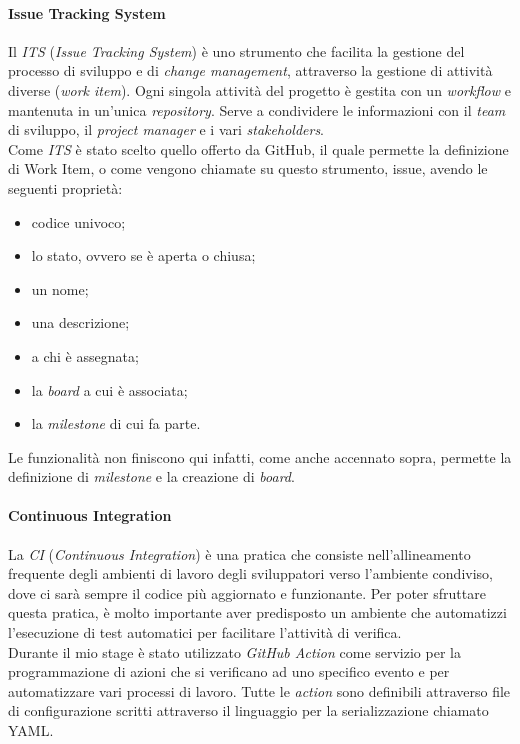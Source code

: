 \paragraph{Issue Tracking System}
Il \textit{ITS} (\textit{Issue Tracking System}) è uno strumento che facilita la gestione del processo di sviluppo e di \textit{change management}, attraverso la gestione di attività diverse (\textit{work item}). Ogni singola attività del progetto è gestita con un \textit{workflow} e mantenuta in un'unica \textit{repository}. Serve a condividere le informazioni con il \textit{team} di sviluppo, il \textit{project manager} e i vari \textit{stakeholders}. \\

Come \textit{ITS} è stato scelto quello offerto da GitHub, il quale permette la definizione di Work Item, o come vengono chiamate su questo strumento, issue, avendo le seguenti proprietà:
\begin{itemize}
  \item codice univoco;
  \item lo stato, ovvero se è aperta o chiusa;
  \item un nome;
  \item una descrizione;
  \item a chi è assegnata;
  \item la \textit{board} a cui è associata;
  \item la \textit{milestone} di cui fa parte.
\end{itemize}

Le funzionalità non finiscono qui infatti, come anche accennato sopra, permette la definizione di \textit{milestone} e la creazione di \textit{board}.


\paragraph{Continuous Integration}
La \textit{CI} (\textit{Continuous Integration}) è una pratica che consiste nell'allineamento frequente degli ambienti di lavoro degli sviluppatori verso l'ambiente condiviso, dove ci sarà sempre il codice più aggiornato e funzionante. Per poter sfruttare questa pratica, è molto importante aver predisposto un ambiente che automatizzi l'esecuzione di test automatici per facilitare l'attività di verifica. \\

Durante il mio stage è stato utilizzato \textit{GitHub Action} come servizio per la programmazione di azioni che si verificano ad uno specifico evento e per automatizzare vari processi di lavoro. Tutte le \textit{action} sono definibili attraverso file di configurazione scritti attraverso il linguaggio per la serializzazione chiamato YAML.

